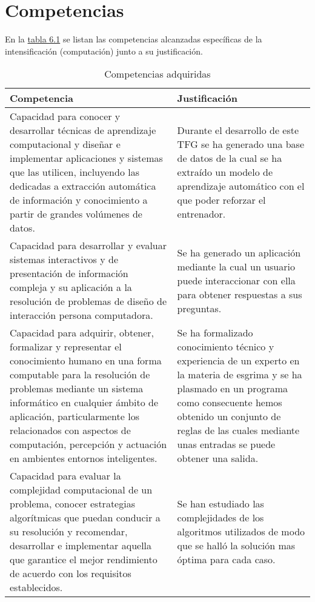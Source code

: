 \section{Competencias}
En la \hyperref[tab:competencias adquiridas]{tabla 6.1} se listan las competencias alcanzadas específicas de la intensificación
(computación) junto a su justificación.

\begin{longtable}{p{} p{}}
  \caption{Competencias adquiridas}
  \label{tab:competencias adquiridas}

  \endfirsthead
  \endhead

  \textbf{Competencia} & \textbf{Justificación} \\
  \hline
  \rowcolor[HTML]{D6D6D6}
  Capacidad para conocer y desarrollar técnicas de aprendizaje computacional y diseñar e implementar aplicaciones y sistemas que las utilicen, incluyendo las dedicadas a extracción automática de información y conocimiento a partir de grandes volúmenes de datos. & Durante el desarrollo de este \acs{TFG} se ha generado una base de datos de la cual se ha extraído un modelo de aprendizaje automático con el que poder reforzar el entrenador.\\

  Capacidad para desarrollar y evaluar sistemas interactivos y de presentación de información compleja y su aplicación a la resolución de problemas de diseño de interacción persona computadora. & Se ha generado un aplicación mediante la cual un usuario puede interaccionar con ella para obtener respuestas a sus preguntas.\\

  \rowcolor[HTML]{D6D6D6}
  Capacidad para adquirir, obtener, formalizar y representar el conocimiento humano en una forma computable para la resolución de problemas mediante un sistema informático en cualquier ámbito de aplicación, particularmente los relacionados con aspectos de computación, percepción y actuación en ambientes entornos inteligentes. &  Se ha formalizado conocimiento técnico y experiencia de un experto en la materia de esgrima y se ha plasmado en un programa como consecuente hemos obtenido un conjunto de reglas de las cuales mediante unas entradas se puede obtener una salida.  \\

  Capacidad para evaluar la complejidad computacional de un problema, conocer estrategias algorítmicas que puedan conducir a su resolución y recomendar, desarrollar e implementar aquella que garantice el mejor rendimiento de acuerdo con los requisitos establecidos. & Se han estudiado las complejidades de los algoritmos utilizados de modo que se halló la solución mas óptima para cada caso. \\

  \hline
\end{longtable}




